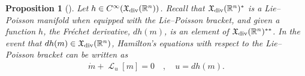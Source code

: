 \documentclass[12pt]{amsart}
\newcommand{\R}{\ensuremath{\mathbb{R}}}
\newtheorem{prop}[thm]{Proposition}
\DeclareMathOperator{\SDiff}{SDiff}
\DeclareMathOperator{\lie}{\mathcal{L}}
\begin{document}
%  
  \begin{prop}[\cite{Arnold1966}] \label{prop:LPDiff}
  Let $h \in C^{\infty}( \mathfrak{X}_{\rm div}(\R^n) )$.
  Recall that $\mathfrak{X}_{\rm div}(\R^n)^*$ is a Lie--Poisson manifold when equipped with the Lie--Poisson bracket,
  and given a function $h$, the Fr\'echet derivative, $dh(m)$, is an element of $\mathfrak{X}_{\rm div}(\R^n)^{**}$.
  In the event that $dh(m) \in \mathfrak{X}_{\rm div}(\R^n)$,
  Hamilton's equations with respect to the Lie--Poisson
  bracket can be written as
  \begin{align}
    \dot{m} + \lie_u [m] = 0 \quad , \quad u = dh(m) \label{eq:LP}.
  \end{align}
\end{prop}
\end{document}
